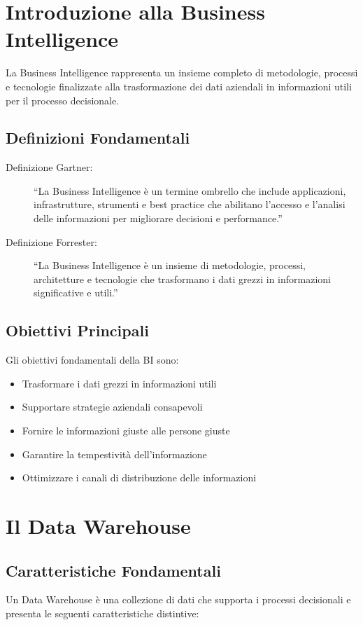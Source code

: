 \chapter{Introduzione alla Business Intelligence}

La Business Intelligence rappresenta un insieme completo di metodologie, processi e tecnologie finalizzate alla trasformazione dei dati aziendali in informazioni utili per il processo decisionale. 

\section{Definizioni Fondamentali}
\begin{description}
\item[Definizione Gartner:] ``La Business Intelligence è un termine ombrello che include applicazioni, infrastrutture, strumenti e best practice che abilitano l'accesso e l'analisi delle informazioni per migliorare decisioni e performance.''
\item[Definizione Forrester:] ``La Business Intelligence è un insieme di metodologie, processi, architetture e tecnologie che trasformano i dati grezzi in informazioni significative e utili.''
\end{description}

\section{Obiettivi Principali}
Gli obiettivi fondamentali della BI sono:
\begin{itemize}
\item Trasformare i dati grezzi in informazioni utili
\item Supportare strategie aziendali consapevoli
\item Fornire le informazioni giuste alle persone giuste
\item Garantire la tempestività dell'informazione
\item Ottimizzare i canali di distribuzione delle informazioni
\end{itemize}

\chapter{Il Data Warehouse}

\section{Caratteristiche Fondamentali}
Un Data Warehouse è una collezione di dati che supporta i processi decisionali e presenta le seguenti caratteristiche distintive:

